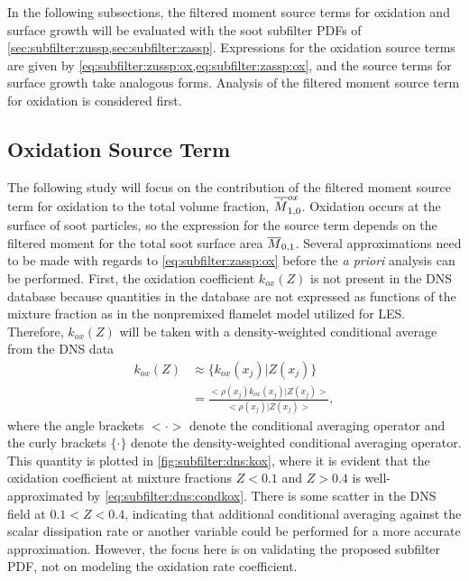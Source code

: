 In the following subsections, the filtered moment source terms for oxidation and surface growth will be evaluated with the soot subfilter PDFs of \cref{sec:subfilter:zussp,sec:subfilter:zassp}. Expressions for the oxidation source terms are given by \cref{eq:subfilter:zussp:ox,eq:subfilter:zassp:ox}, and the source terms for surface growth take analogous forms. Analysis of the filtered moment source term for oxidation is considered first.

\subsection{Oxidation Source Term}
\label{sec:subfilter:dns:ox}

The following study will focus on the contribution of the filtered moment source term for oxidation to the total volume fraction, $\fst[M]{1,0}^{ox}$. Oxidation occurs at the surface of soot particles, so the expression for the source term depends on the filtered moment for the total soot surface area $\mean{M}_{0,1}$. Several approximations need to be made with regards to \cref{eq:subfilter:zassp:ox} before the \textit{a priori} analysis can be performed. First, the oxidation coefficient $k_{ox}(Z)$ is not present in the DNS database because quantities in the database are not expressed as functions of the mixture fraction as in the nonpremixed flamelet model utilized for LES. Therefore, $k_{ox}(Z)$ will be taken with a density-weighted conditional average from the DNS data
\begin{equation}\label{eq:subfilter:dns:condkox}
  \begin{split}
    k_{ox}(Z) &\approx \{ k_{ox}(x_j)|Z(x_j) \} \\
    &= \frac{<\rho(x_j)k_{ox}(x_j)|Z(x_j)>}{<\rho(x_j)|Z(x_j)>},
  \end{split}
\end{equation}
where the angle brackets $< \cdot >$ denote the conditional averaging operator and the curly brackets $\{ \cdot \}$ denote the density-weighted conditional averaging operator. This quantity is plotted in \cref{fig:subfilter:dns:kox}, where it is evident that the oxidation coefficient at mixture fractions $Z < 0.1$ and $Z > 0.4$ is well-approximated by \cref{eq:subfilter:dns:condkox}. There is some scatter in the DNS field at $0.1 < Z < 0.4$, indicating that additional conditional averaging against the scalar dissipation rate or another variable could be performed for a more accurate approximation. However, the focus here is on validating the proposed subfilter PDF, not on modeling the oxidation rate coefficient.

